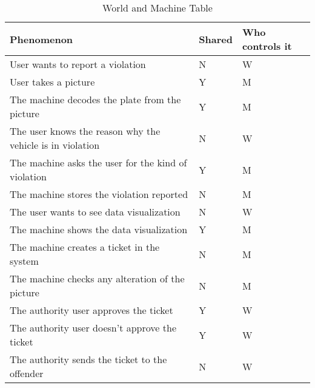 
\begin{table}[H]
\begin{tabular}{|l|l|l|}
\hline
\textbf{Phenomenon}        & \textbf{Shared} & \textbf{Who controls it} \\ \hline
User wants to report a violation  & N & W                                     \\ \hline
User takes a picture              & Y & M                                   \\ \hline
The machine decodes the plate from the picture   &  Y &   M         \\ \hline
The user knows the reason why the vehicle is in violation & N &  W          \\ \hline
The machine asks the user for the kind of violation &Y & M              \\ \hline
The machine stores the violation reported        &  N   &    M           \\ \hline
The user wants to see data visualization  &  N   &    W           \\ \hline
The machine shows the data visualization  &  Y   &    M           \\ \hline
The machine creates a ticket in the system        &  N   &    M           \\ \hline
The machine checks any alteration of the picture       &  N   &    M           \\ \hline
The authority user approves the ticket       &  Y   &    W           \\ \hline
The authority user doesn't approve the ticket       &  Y   &    W         \\ \hline
The authority sends the ticket to the offender & N & W \\ \hline
\end{tabular}

\caption{World and Machine Table}
		\label{WorldMachinetable}
\end{table}
